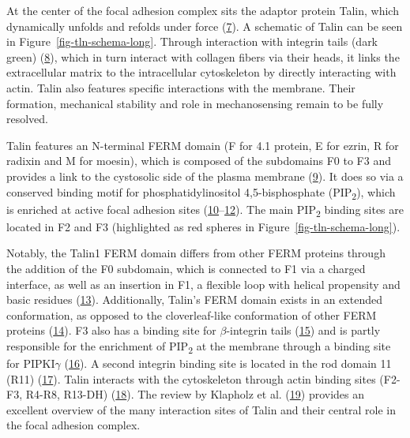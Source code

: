 \documentclass[
  twocolumn]{biophys-new-mod}
\begin{document}
At the center of the focal adhesion complex sits the adaptor protein
Talin, which dynamically unfolds and refolds under force
(\protect\hyperlink{ref-yaoMechanicalResponseTalin2016}{7}). A schematic
of Talin can be seen in Figure~\ref{fig-tln-schema-long}. Through
interaction with integrin tails (dark green)
(\protect\hyperlink{ref-tadokoroTalinBindingIntegrin2003}{8}), which in
turn interact with collagen fibers via their heads, it links the
extracellular matrix to the intracellular cytoskeleton by directly
interacting with actin. Talin also features specific interactions with
the membrane. Their formation, mechanical stability and role in
mechanosensing remain to be fully resolved.

Talin features an N-terminal FERM domain (F for 4.1 protein, E for
ezrin, R for radixin and M for moesin), which is composed of the
subdomains F0 to F3 and provides a link to the cystosolic side of the
plasma membrane
(\protect\hyperlink{ref-chishtiFERMDomainUnique1998}{9}). It does so via
a conserved binding motif for phosphatidylinositol 4,5-bisphosphate
(PIP\textsubscript{2}), which is enriched at active focal adhesion sites
(\protect\hyperlink{ref-maniFERMDomainPhosphoinositide2011}{10}--\protect\hyperlink{ref-songNovelMembranedependentSwitch2012a}{12}).
The main PIP\textsubscript{2} binding sites are located in F2 and F3
(highlighted as red spheres in Figure~\ref{fig-tln-schema-long}).

Notably, the Talin1 FERM domain differs from other FERM proteins through
the addition of the F0 subdomain, which is connected to F1 via a charged
interface, as well as an insertion in F1, a flexible loop with helical
propensity and basic residues
(\protect\hyperlink{ref-goultStructureDoubleUbiquitinlike2010}{13}).
Additionally, Talin's FERM domain exists in an extended conformation, as
opposed to the cloverleaf-like conformation of other FERM proteins
(\protect\hyperlink{ref-elliottStructureTalinHead2010}{14}). F3 also has
a binding site for \(\beta\)-integrin tails
(\protect\hyperlink{ref-calderwoodTalinHeadDomain1999}{15}) and is
partly responsible for the enrichment of PIP\textsubscript{2} at the
membrane through a binding site for PIPKI\(\gamma\)
(\protect\hyperlink{ref-calderwoodTalinsKindlinsPartners2013}{16}). A
second integrin binding site is located in the rod domain 11 (R11)
(\protect\hyperlink{ref-horwitzInteractionPlasmaMembrane1986}{17}).
Talin interacts with the cytoskeleton through actin binding sites
(F2-F3, R4-R8, R13-DH)
(\protect\hyperlink{ref-mccannLWEQModuleConserved1997}{18}). The review
by Klapholz et al.
(\protect\hyperlink{ref-klapholzTalinMasterIntegrin2017}{19}) provides
an excellent overview of the many interaction sites of Talin and their
central role in the focal adhesion complex.
\end{document}
